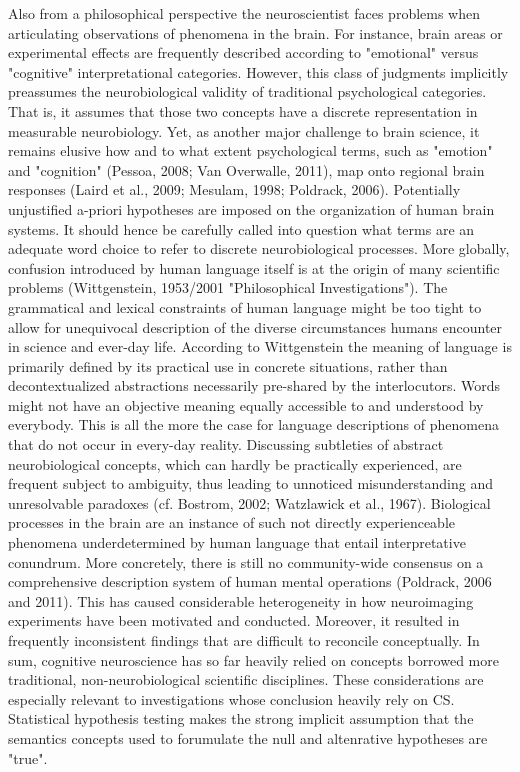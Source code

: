 \documentclass[authoryear,review,3p]{elsarticle}
\begin{document}
Also from a philosophical perspective
the neuroscientist faces problems when articulating observations of
phenomena in the brain.
%
For instance, brain areas or experimental effects are frequently
described according to "emotional" versus "cognitive"
interpretational categories.
However, this class of judgments implicitly preassumes
the neurobiological validity of traditional psychological categories.
That is, it assumes that those two concepts have
a discrete representation in measurable neurobiology.
Yet, as another major challenge to brain science,
it remains elusive how and to what extent psychological terms,
such as "emotion" and "cognition" (Pessoa, 2008; Van Overwalle, 2011),
map onto regional brain responses
(Laird et al., 2009; Mesulam, 1998; Poldrack, 2006). 
Potentially unjustified a-priori hypotheses are imposed
on the organization of human brain systems.
%
It should hence be carefully called into question what terms
are an adequate word choice to refer to discrete
neurobiological processes.
More globally,
confusion introduced by human language itself is at the origin
of many scientific problems
(Wittgenstein, 1953/2001 "Philosophical Investigations").
The grammatical and lexical constraints of human language might be
too tight to allow for unequivocal description of the diverse
circumstances humans encounter in science and ever-day life.
According to Wittgenstein the meaning of language is primarily
defined by its practical use in concrete situations,
rather than decontextualized abstractions necessarily pre-shared
by the interlocutors.
Words might not have an objective meaning
equally accessible to and understood by everybody.
This is all the more the case for language descriptions
of phenomena that do not occur in every-day reality.
Discussing subtleties of abstract neurobiological concepts,
which can hardly be practically experienced,
are frequent subject to ambiguity, thus leading to
unnoticed misunderstanding and unresolvable paradoxes
(cf. Bostrom, 2002; Watzlawick et al., 1967).
Biological processes in the brain are an instance of
such not directly experienceable phenomena underdetermined
by human language that entail interpretative conundrum.
%
More concretely,
there is still no community-wide consensus on
a comprehensive description system of
human mental operations (Poldrack, 2006 and 2011).
This has caused considerable heterogeneity in
how neuroimaging experiments have been motivated and conducted.
Moreover, it resulted in frequently inconsistent findings
that are difficult to reconcile conceptually. 
%
In sum,
cognitive neuroscience has so far heavily relied on concepts
borrowed more traditional, non-neurobiological scientific disciplines.
These considerations are especially relevant to investigations
whose conclusion heavily rely on CS.
Statistical hypothesis testing makes the
strong implicit assumption that
the semantics concepts used to forumulate 
the null and altenrative hypotheses are "true".
\end{document}
